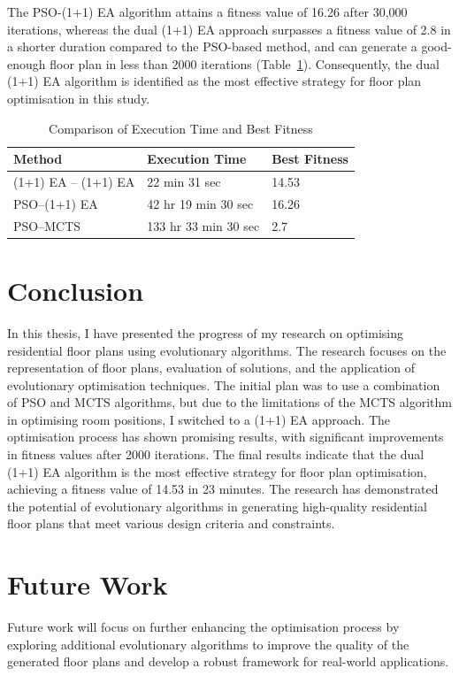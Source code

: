 \documentclass[]{article}
\begin{document}
The PSO-(1+1) EA algorithm attains a fitness value of 16.26 after 30,000 iterations, whereas the dual (1+1) EA approach surpasses a fitness value of 2.8 in a shorter duration compared to the PSO-based method, and can generate a good-enough floor plan in less than 2000 iterations (Table~\ref{tab:algorithm_comparison}). Consequently, the dual (1+1) EA algorithm is identified as the most effective strategy for floor plan optimisation in this study.
\begin{table}[h]
    \centering
    \caption{Comparison of Execution Time and Best Fitness}
    \label{tab:algorithm_comparison}
    \begin{tabularx}{\textwidth}{l | l | l}
        \hline
        \textbf{Method}      & \textbf{Execution Time} & \textbf{Best Fitness} \\
        \hline
        (1+1) EA -- (1+1) EA & 22 min 31 sec           & 14.53                 \\
        PSO--(1+1) EA        & 42 hr 19 min 30 sec     & 16.26                 \\
        PSO--MCTS            & 133 hr 33 min 30 sec    & 2.7                   \\
        \hline
    \end{tabularx}
\end{table}

\section{Conclusion}
In this thesis, I have presented the progress of my research on optimising residential floor plans using evolutionary algorithms. The research focuses on the representation of floor plans, evaluation of solutions, and the application of evolutionary optimisation techniques. The initial plan was to use a combination of PSO and MCTS algorithms, but due to the limitations of the MCTS algorithm in optimising room positions, I switched to a (1+1) EA approach. The optimisation process has shown promising results, with significant improvements in fitness values after 2000 iterations.
The final results indicate that the dual (1+1) EA algorithm is the most effective strategy for floor plan optimisation, achieving a fitness value of 14.53 in 23 minutes. The research has demonstrated the potential of evolutionary algorithms in generating high-quality residential floor plans that meet various design criteria and constraints.

\section{Future Work}
Future work will focus on further enhancing the optimisation process by exploring additional evolutionary algorithms to improve the quality of the generated floor plans and develop a robust framework for real-world applications.
\end{document}
